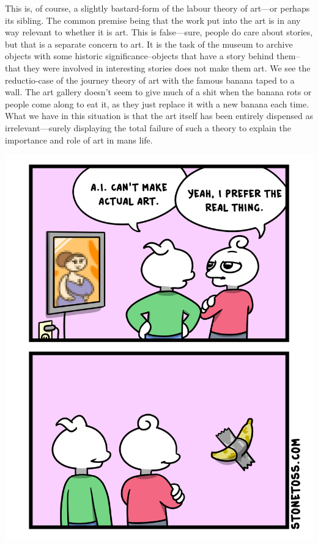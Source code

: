 \documentclass[11pt]{article}
\begin{document}
This is, of course, a slightly bastard-form of the labour theory of art---or perhaps its sibling. The common premise being that the work put into the art is in any way relevant to whether it is art. This is false---sure, people do care about stories, but that is a separate concern to art. It is the task of the museum to archive objects with some historic significance--objects that have a story behind them--that they were involved in interesting stories does not make them art. We see the reductio-case of the journey theory of art with the famous banana taped to a wall. The art gallery doesn't seem to give much of a shit when the banana rots or people come along to eat it, as they just replace it with a new banana each time. What we have in this situation is that the art itself has been entirely dispensed as irrelevant---surely displaying the total failure of such a theory to explain the importance and role of art in mans life.

\begin{center}
\includegraphics[width=.9\linewidth]{./images/ai-art-stonetoss-comic.png}
\end{center}
\end{document}

